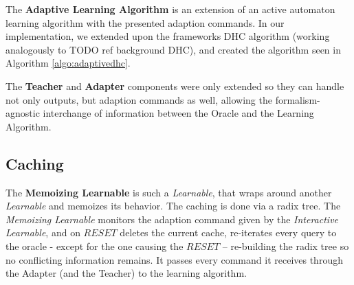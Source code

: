 The \textbf{Adaptive Learning Algorithm} is an extension of an active automaton learning algorithm with the presented adaption commands. In our implementation, we extended upon the frameworks DHC algorithm (working analogously to TODO ref background DHC), and created the algorithm seen in Algorithm \ref{algo:adaptivedhc}.

The \textbf{Teacher} and \textbf{Adapter} components were only extended so they can handle not only outputs, but adaption commands as well, allowing the formalism-agnostic interchange of information between the Oracle and the Learning Algorithm.



\subsection{Caching} \label{subsec_memoization}

The \textbf{Memoizing Learnable} is such a \textit{Learnable}, that wraps around another \textit{Learnable} and memoizes its behavior. The caching is done via a radix tree. The \textit{Memoizing Learnable} monitors the adaption command given by the \textit{Interactive Learnable}, and on $RESET$ deletes the current cache, re-iterates every query to the oracle - except for the one causing the $RESET$ -- re-building the radix tree so no conflicting information remains. It passes every command it receives through the Adapter (and the Teacher) to the learning algorithm.